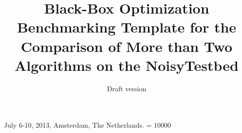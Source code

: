 \documentclass{sig-alternate}
\begin{document}
%
 {July 6-10, 2013, Amsterdam, The Netherlands.}
\widowpenalty = 10000

\title{Black-Box Optimization Benchmarking Template for the Comparison of More than Two Algorithms on the NoisyTestbed}
\subtitle{Draft version
}

%
%
%
%
%
\end{document}
